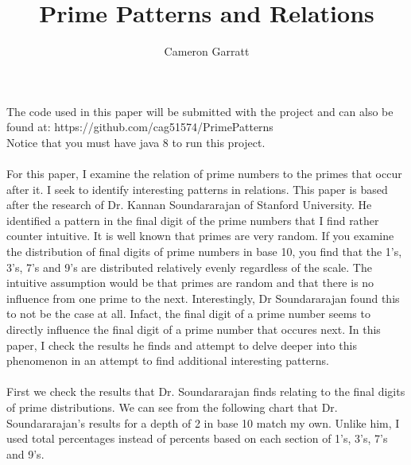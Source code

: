 \documentclass[13pt]{article}
\title{Prime Patterns and Relations}
\author{Cameron Garratt}
\begin{document}
\maketitle
\large
The code used in this paper will be submitted with the project and can also be found at: https://github.com/cag51574/PrimePatterns\\ Notice that you must have java 8 to run this project.\\\\
For this paper, I examine the relation of prime numbers to the primes that occur after it. 
I seek to identify interesting patterns in relations. 
This paper is based after the research of Dr. 
Kannan Soundararajan of Stanford University. 
He identified a pattern in the final digit of the prime numbers that I find rather counter intuitive. 
It is well known that primes are very random. 
If you examine the distribution of final digits of prime numbers in base 10, you find that the 1's, 3's, 7's and 9's are distributed relatively evenly regardless of the scale. 
The intuitive assumption would be that primes are random and that there is no influence from one prime to the next. 
Interestingly, Dr Soundararajan found this to not be the case at all. 
Infact, the final digit of a prime number seems to directly influence the final digit of a prime number that occures next.
In this paper, I check the results he finds and attempt to delve deeper into this phenomenon in an attempt to find additional interesting patterns.\\\\
\indent
First we check the results that Dr. Soundararajan finds relating to the final digits of prime distributions. We can see from the following chart that Dr. Soundararajan's results for a depth of 2 in base 10 match my own. Unlike him, I used total percentages instead of percents based on each section of 1's, 3's, 7's and 9's.\\\\
\end{document}

